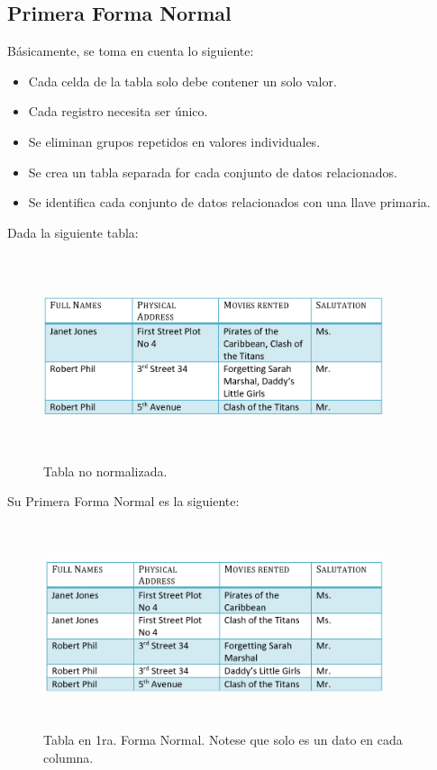 \documentclass[letterpaper, 12pt]{article}
\begin{document}
\begin{justify}
        \section{Primera Forma Normal}
        \justify
        Básicamente, se toma en cuenta lo siguiente:
        \begin{itemize}
            \item Cada celda de la tabla solo debe contener un solo valor.
            \item Cada registro necesita ser único.
            \item Se eliminan grupos repetidos en valores individuales.
            \item Se crea un tabla separada for cada conjunto de datos relacionados.
            \item Se identifica cada conjunto de datos relacionados con una llave primaria.
        \end{itemize}
        Dada la siguiente tabla:
        \begin{figure}[H]
            \centering
            \includegraphics[width=10cm,height=6cm]{tabla-nonormalizada.png}
            \caption{Tabla no normalizada.}
        \end{figure}
        \justify
        Su Primera Forma Normal es la siguiente:
        \begin{figure}[H]
            \centering
            \includegraphics[width=10cm,height=6cm]{1NF.png}
            \caption{Tabla en 1ra. Forma Normal. Notese que solo es un dato en cada columna.}
        \end{figure}        


\end{justify}
\end{document}
